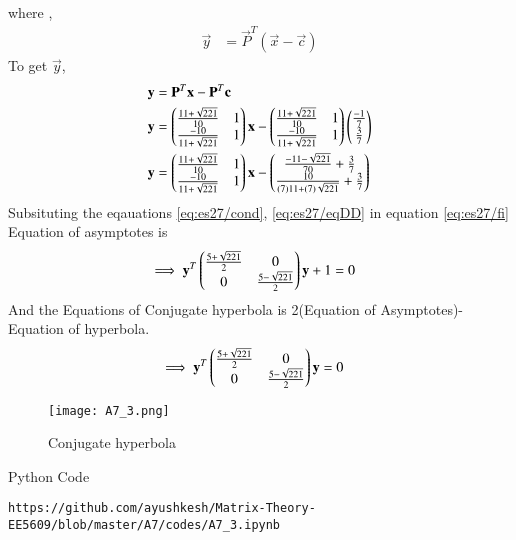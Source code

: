 \documentclass[journal,12pt,twocolumn]{IEEEtran}
\begin{document}
where ,
\begin{align}
    \vec{y}&=\vec{P}^T(\vec{x}-\vec{c})
\end{align}
To get $\vec{y}$,
\begin{align}
\mathbf{y}&=\mathbf{P}^T\mathbf{x}-\mathbf{P}^T\mathbf{c}\\
    \mathbf{y}&= \begin{pmatrix}\frac{11+\sqrt{221}}{10} & 1 \\ \frac{-10}{11+\sqrt{221}} & 1\end{pmatrix}\mathbf{x}-\begin{pmatrix}\frac{11+\sqrt{221}}{10} & 1 \\ \frac{-10}{11+\sqrt{221}} & 1\end{pmatrix}\begin{pmatrix}\frac{-1}{7}\\\frac{3}{7}\end{pmatrix}\\
    \mathbf{y}&=\begin{pmatrix}\frac{11+\sqrt{221}}{10} & 1 \\ \frac{-10}{11+\sqrt{221}} & 1\end{pmatrix}\mathbf{x}-\begin{pmatrix}\frac{-11-\sqrt{221}}{70}+\frac{3}{7} \\ \frac{10}{(7)11+(7)\sqrt{221}}+\frac{3}{7}\end{pmatrix}
\end{align}
Subsituting the eqauations \eqref{eq:es27/cond}, \eqref{eq:es27/eqDD} in equation \eqref{eq:es27/fi}
Equation of asymptotes is
\begin{align}
    \implies \mathbf{y}^T\begin{pmatrix}\frac{5+\sqrt{221}}{2} & 0 \\0 & \frac{5-\sqrt{221}}{2}\end{pmatrix}\mathbf{y}+1&=0
\end{align}
And the Equations of Conjugate hyperbola is 2(Equation of Asymptotes)- Equation of hyperbola. 
\begin{align}
    \implies \mathbf{y}^T\begin{pmatrix}\frac{5+\sqrt{221}}{2} & 0 \\0 & \frac{5-\sqrt{221}}{2}\end{pmatrix}\mathbf{y}&=0
\end{align}
\renewcommand{\thefigure}{1}
\begin{figure}[h]
    \centering
    \texttt{[image: A7\_3.png]}
    \caption{Conjugate hyperbola}
    \label{Fig :3}
\end{figure}
Python Code 
\begin{lstlisting}
https://github.com/ayushkesh/Matrix-Theory-EE5609/blob/master/A7/codes/A7_3.ipynb
\end{lstlisting}
\end{document}

